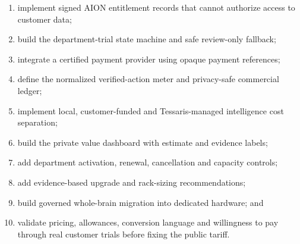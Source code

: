\begin{enumerate}
  \item implement signed AION entitlement records that cannot authorize access to customer data;
  \item build the department-trial state machine and safe review-only fallback;
  \item integrate a certified payment provider using opaque payment references;
  \item define the normalized verified-action meter and privacy-safe commercial ledger;
  \item implement local, customer-funded and Tessaris-managed intelligence cost separation;
  \item build the private value dashboard with estimate and evidence labels;
  \item add department activation, renewal, cancellation and capacity controls;
  \item add evidence-based upgrade and rack-sizing recommendations;
  \item build governed whole-brain migration into dedicated hardware; and
  \item validate pricing, allowances, conversion language and willingness to pay through real
        customer trials before fixing the public tariff.
\end{enumerate}
